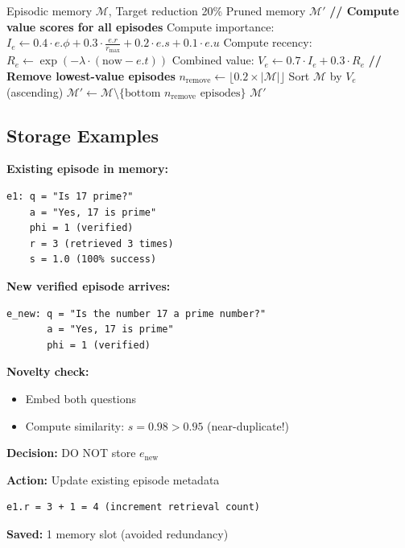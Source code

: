 \documentclass[12pt,a4paper]{article}
\theoremstyle{definition}
\begin{document}
\begin{algorithm}[htbp]
\caption{Memory Pruning When Near Capacity}
\begin{algorithmic}[1]
\Require Episodic memory $\mathcal{M}$, Target reduction 20\%
\Ensure Pruned memory $\mathcal{M}'$
\State
\State \textbf{// Compute value scores for all episodes}
    \State Compute importance:
    \State \quad $I_e \gets 0.4 \cdot e.\phi + 0.3 \cdot \frac{e.r}{r_{\max}} + 0.2 \cdot e.s + 0.1 \cdot e.u$
    \State Compute recency:
    \State \quad $R_e \gets \exp(-\lambda \cdot (\text{now} - e.t))$ 
    \State Combined value:
    \State \quad $V_e \gets 0.7 \cdot I_e + 0.3 \cdot R_e$ 
\EndFor
\State
\State \textbf{// Remove lowest-value episodes}
\State $n_{\text{remove}} \gets \lfloor 0.2 \times |\mathcal{M}| \rfloor$ 
\State Sort $\mathcal{M}$ by $V_e$ (ascending)
\State $\mathcal{M}' \gets \mathcal{M} \setminus \{\text{bottom } n_{\text{remove}} \text{ episodes}\}$
\State
\State \Return $\mathcal{M}'$ 
\end{algorithmic}
\end{algorithm}

\subsection{Storage Examples}

\begin{examplebox}[title=Scenario 1: Redundancy Detected]

\textbf{Existing episode in memory:}
\begin{verbatim}
e1: q = "Is 17 prime?"
    a = "Yes, 17 is prime"
    phi = 1 (verified)
    r = 3 (retrieved 3 times)
    s = 1.0 (100% success)
\end{verbatim}

\textbf{New verified episode arrives:}
\begin{verbatim}
e_new: q = "Is the number 17 a prime number?"
       a = "Yes, 17 is prime"
       phi = 1 (verified)
\end{verbatim}

\textbf{Novelty check:}
\begin{itemize}
    \item Embed both questions
    \item Compute similarity: $s = 0.98 > 0.95$ (near-duplicate!)
\end{itemize}

\textbf{Decision:} DO NOT store $e_{\text{new}}$

\textbf{Action:} Update existing episode metadata
\begin{verbatim}
e1.r = 3 + 1 = 4 (increment retrieval count)
\end{verbatim}

\textbf{Saved:} 1 memory slot (avoided redundancy)
\end{examplebox}
\end{document}
